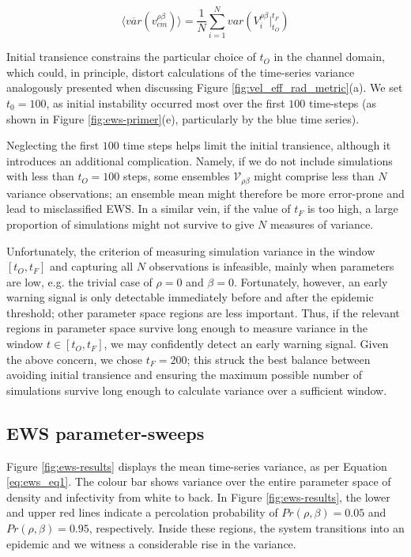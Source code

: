 \begin{equation}
\label{eq:ews_eq1}
    \big\langle \overline{var}(v^{\rho\beta}_{cm}) \big\rangle = \frac{1}{N}\sum\limits_{i=1}^{N} var(V_i^{\rho\beta}\Big|^{t_F}_{t_O})
\end{equation}

Initial transience constrains the particular choice of $t_O$ in the channel domain, 
which could, in principle, distort calculations of the time-series variance\textemdash 
analogously presented when discussing Figure \ref{fig:vel_eff_rad_metric}(a). 
We set $t_0=100$, as initial instability occurred most over the first $100$ time-steps 
(as shown in Figure \ref{fig:ews-primer}(e), particularly by the blue time series). 

Neglecting the first $100$ time steps helps limit the initial transience,
although it introduces an additional complication.
Namely, if we do not include simulations with less than $t_O=100$ steps, some ensembles $\mathcal{V}_{\rho\beta}$ %
might comprise less than $N$ variance observations;
an ensemble mean might therefore be more error-prone and lead to misclassified EWS.
In a similar vein, if the value of $t_F$ is too high, a large proportion of simulations might not survive to give $N$ measures of variance. 

Unfortunately, the criterion of measuring simulation variance in the window $[t_O, t_F]$ 
and capturing all $N$ observations is infeasible, mainly when parameters are low, e.g. the trivial case of $\rho=0$ and $\beta=0$.
Fortunately, however, an early warning signal is only detectable immediately before 
and after the epidemic threshold; other parameter space regions are less important.
Thus, if the relevant regions in parameter space survive long enough to measure variance in the window $t \in [t_O, t_F]$, 
we may confidently detect an early warning signal.
Given the above concern, we chose $t_F = 200$; 
this struck the best balance between avoiding initial transience and ensuring the maximum possible number of simulations 
survive long enough to calculate variance over a sufficient window.


\subsection{EWS parameter-sweeps}
\label{section:ews_slm}

Figure \ref{fig:ews-results} displays the mean time-series variance, as per Equation \ref{eq:ews_eq1}.
The colour bar shows variance over the entire parameter space of density and infectivity from white to back.
In Figure \ref{fig:ews-results}, the lower and upper red lines indicate a percolation probability of $Pr(\rho, \beta)=0.05$ and $Pr(\rho, \beta)=0.95$, respectively.
Inside these regions, the system transitions into an epidemic and we witness a considerable rise in the variance.

